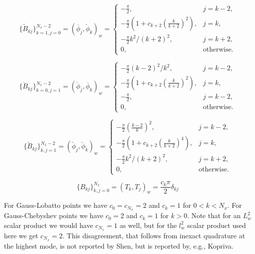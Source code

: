 \documentclass[11pt, oneside]{article}
\newcommand{\N}[1]{\check{#1}}
\newcommand{\D}[1]{\overline{#1}}
\begin{document}
\begin{equation}
 \{\tilde{B}_{kj}\}_{k=1, j=0}^{N_x-2} = (\D{\phi}_j, \N{\phi}_k)_w = \begin{cases}
 -\frac{\pi}{2}, &j=k-2,\\
 -\frac{\pi}{2}\left(1+ {c_{k+2}}\left(\frac{k}{k+2}\right)^2 \right), &j=k,\\
 -\frac{\pi}{2} k^2/(k+2)^2 , & j=k+2, \\
 0, &\text{otherwise}.
 \end{cases}
\end{equation}

\begin{equation}
 \{\grave{B}_{kj}\}_{k=0, j=1}^{N_x-2} = (\N{\phi}_j, \D{\phi}_k)_w = \begin{cases}
 -\frac{\pi}{2} (k-2)^2/k^2 , & j=k-2, \\
 -\frac{\pi}{2}\left(1+ {c_{k+2}} \left(\frac{k}{k+2}\right)^2 \right), &j=k,\\
 -\frac{\pi}{2}, &j=k-2,\\
 0, &\text{otherwise}.
 \end{cases}
\end{equation}

\begin{equation}
 \{\N{B}_{kj}\}_{k,j=1}^{N_x-2} = (\N{\phi}_j, \N{\phi}_k)_w = \begin{cases}
 -\frac{\pi}{2} \left(\frac{k-2}{k}\right)^2, &j=k-2,\\
 -\frac{\pi}{2}\left(1+ {c_{k+2}}\left(\frac{k}{k+2}\right)^4 \right), &j=k,\\
 -\frac{\pi}{2} k^2/(k+2)^2 , & j=k+2, \\
 0, &\text{otherwise}.
 \end{cases}
\end{equation}

\begin{equation}
 \{B_{kj}\}_{k,j=0}^{N_x} = (T_k, T_j)_w = \frac{c_k \pi}{2} \delta_{kj}
\end{equation}

For Gauss-Lobatto points we have $c_0=c_{N_x}=2$ and $c_k=1$ for $0<k<N_x$. For Gauss-Chebyshev points we have $c_0=2$ and $c_k=1$ for $k>0$. Note that for an $L^2_w$ scalar product we would have $c_{N_x}=1$ as well, but for the $l^2_w$ scalar product used here we get $c_{N_x}=2$. This disagreement, that follows from inexact quadrature at the highest mode, is not reported by Shen, but is reported by, e.g., Kopriva.
\end{document}
